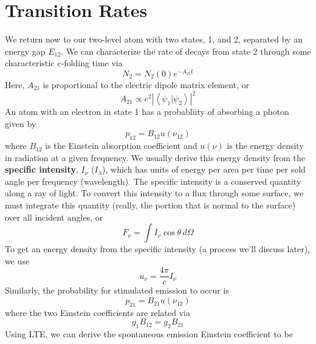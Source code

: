 \documentclass[10pt]{article}
\numberwithin{equation}{section}
\newcommand{\norm}[1]{\left\lvert#1\right\rvert}
\newcommand{\avg}[1]{\left\langle#1\right\rangle}
\begin{document}
\section{Transition Rates} %
\label{sec:transition_rates}
We return now to our two-level atom with two states, 1, and 2, separated by an
energy gap $E_{12}$. We can characterize the rate of decays from state 2
through some characteristic $e$-folding time via
\begin{equation}
  \label{eq:trans:1} N_2 = N_2(0)e^{-A_{21}t}
\end{equation}
Here, $A_{21}$ is proportional to the electric dipole matrix element, or
\begin{equation}
  \label{eq:trans:2} A_{21}\propto e^2\norm{\avg{\psi_1\vert\psi_2}}^2
\end{equation}
An atom with an electron in state 1 has a probabliity of absorbing a photon
given by
\begin{equation}
  \label{eq:trans:3} p_{12} = B_{12} u(\nu_{12})
\end{equation}
where $B_{12}$ is the Einstein absorption coefficient and $u(\nu)$ is the energy density in radiation at a given frequency. We usually derive this energy density from the \textbf{specific intensity}, $I_\nu$ ($I_\lambda$), which has units of energy per area per time per sold angle per frequency (wavelength). The specific intensity is a conserved quantity along a ray of light. To convert this intensity to a flux through some surface, we must integrate this quantity (really, the portion that is normal to the surface) over all incident angles, or
\begin{equation}
  \label{eq:trans:4} F_\nu = \int I_\nu\cos\theta\,d\Omega
\end{equation}
To get an energy density from the specific intensity (a process we'll discuss later), we use
\begin{equation}
  \label{eq:trans:5} u_\nu = \frac{4\pi}{c}I_\nu
\end{equation}
Similarly, the probability for stimulated emission to occur is
\begin{equation}
  \label{eq:trans:6} p_{21} = B_{21}u(\nu_{12})
\end{equation}
where the two Einstein coefficients are related via
\begin{equation}
  \label{eq:trans:7} g_1 B_{12} = g_2B_{21}
\end{equation}
Using LTE, we can derive the spontaneous emission Einstein coefficient to be

\end{document}
